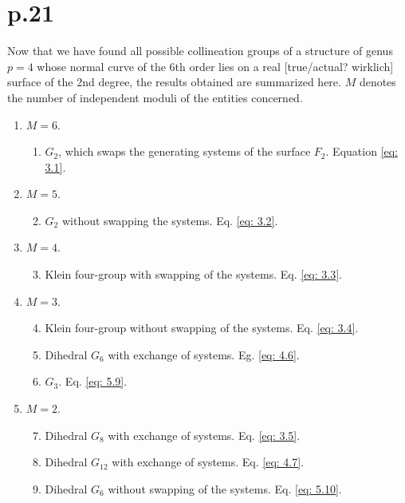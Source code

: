 \documentclass[leqno]{article}
\begin{document}
\section{p.21}
Now that we have found all possible collineation groups of a structure of genus $p=4$ whose normal curve of the 6th order lies on a real [true/actual? wirklich] surface of the 2nd degree, the results obtained are summarized here. $M$ denotes the number of independent moduli of the entities concerned. 
\begin{enumerate}[label=\alph*.]
	\item $M=6$.
	\begin{enumerate}[label=\arabic*)]
		\item $G_2$, which swaps the generating systems of the surface $F_2$. Equation \eqref{eq: 3.1}.
	\end{enumerate}
    \item $M=5$.
    \begin{enumerate}[label=\arabic*)]
    	\setcounter{enumii}{1}
    	\item $G_2$ without swapping the systems. Eq. \eqref{eq: 3.2}.
    \end{enumerate}
    \item $M=4$.
    \begin{enumerate}[label=\arabic*)]
    	\setcounter{enumii}{2}
    	\item Klein four-group with swapping of the systems. Eq. \eqref{eq: 3.3}.
    \end{enumerate}
    \item $M=3$.
    \begin{enumerate}[label=\arabic*)]
    	\setcounter{enumii}{3}
    	\item Klein four-group without swapping of the systems. Eq. \eqref{eq: 3.4}.
    	\item Dihedral $G_6$ with exchange of systems. Eg. \eqref{eq: 4.6}. 
    	\item $G_3$. Eq. \eqref{eq: 5.9}.
    \end{enumerate}
    \item $M=2$.
    \begin{enumerate}[label=\arabic*)]
    	\setcounter{enumii}{6}
    	\item Dihedral $G_8$ with exchange of systems. Eq. \eqref{eq: 3.5}.
    	\item Dihedral $G_{12}$ with exchange of systems. Eq. \eqref{eq: 4.7}.  
    	\item Dihedral $G_6$ without swapping of the systems. Eq. \eqref{eq: 5.10}.

\end{enumerate}
\end{enumerate}
\end{document}
